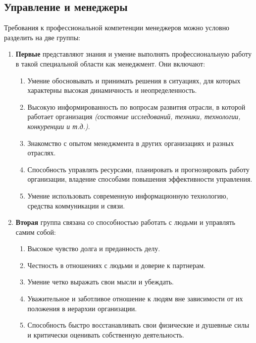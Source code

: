 \documentclass[a4paper,12pt,oneside,final]{extarticle}
\numberwithin{equation}{section}
\begin{document}
\subsection{Управление и менеджеры}
Требования к профессиональной компетенции менеджеров можно условно разделить на две группы:
\begin{enumerate}
	\item \textbf{Первые} представляют знания и умение выполнять профессиональную работу в такой специальной области как менеджмент. 
	Они включают:
	\begin{enumerate}
		\item Умение обосновывать и принимать решения в ситуациях,  для которых характерны высокая динамичность и неопределенность.
		\item Высокую информированность по вопросам развития отрасли, в которой работает организация \textit{(состояние исследований, техники, технологии, конкуренции и т.д.)}.
		\item Знакомство с опытом менеджмента в других организациях и разных отраслях.
		\item Способность управлять ресурсами, планировать и прогнозировать работу организации, владение способами повышения эффективности управления.
		\item Умение использовать современную информационную технологию, средства коммуникации и связи.
	\end{enumerate}
	\item \textbf{Вторая} группа связана со способностью работать с людьми и управлять самим собой:
	\begin{enumerate}
		\item Высокое чувство долга и преданность делу.
		\item Честность в отношениях с людьми и доверие к партнерам.
		\item Умение четко выражать свои мысли и убеждать.
		\item Уважительное и заботливое отношение к людям вне зависимости от их положения в иерархии организации.
		\item Способность быстро восстанавливать свои физические и душевные силы и критически оценивать собственную деятельность.
	\end{enumerate}
\end{enumerate}
\end{document}
